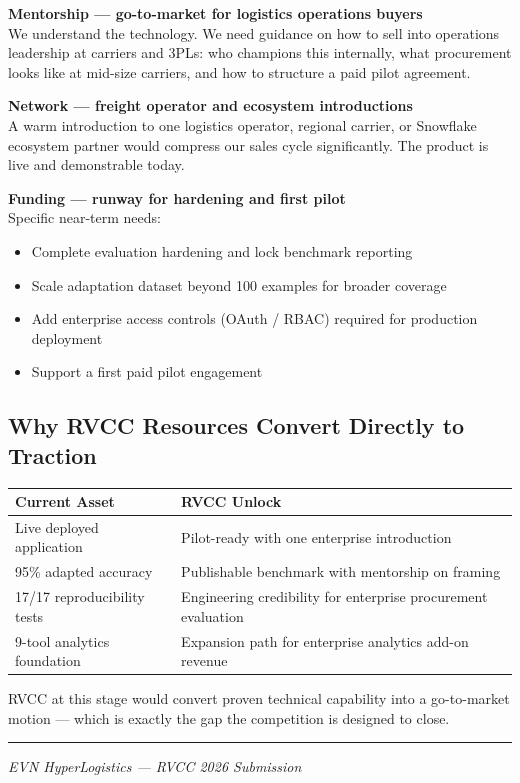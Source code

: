 \documentclass[11pt,letterpaper]{article}
\begin{document}
\textbf{Mentorship --- go-to-market for logistics operations buyers}\\
We understand the technology. We need guidance on how to sell into operations leadership at carriers and 3PLs: who champions this internally, what procurement looks like at mid-size carriers, and how to structure a paid pilot agreement.

\textbf{Network --- freight operator and ecosystem introductions}\\
A warm introduction to one logistics operator, regional carrier, or Snowflake ecosystem partner would compress our sales cycle significantly. The product is live and demonstrable today.

\textbf{Funding --- runway for hardening and first pilot}\\
Specific near-term needs:
\begin{itemize}[leftmargin=1.5em, itemsep=0.2em]
    \item Complete evaluation hardening and lock benchmark reporting
    \item Scale adaptation dataset beyond 100 examples for broader coverage
    \item Add enterprise access controls (OAuth / RBAC) required for production deployment
    \item Support a first paid pilot engagement
\end{itemize}

\subsection*{Why RVCC Resources Convert Directly to Traction}

\vspace{0.3em}
\begin{tabular}{@{}L{5.5cm}L{8cm}@{}}
    \toprule
    \textbf{Current Asset} & \textbf{RVCC Unlock} \\
    \midrule
    Live deployed application & Pilot-ready with one enterprise introduction \\[0.3em]
    95\% adapted accuracy & Publishable benchmark with mentorship on framing \\[0.3em]
    17/17 reproducibility tests & Engineering credibility for enterprise procurement evaluation \\[0.3em]
    9-tool analytics foundation & Expansion path for enterprise analytics add-on revenue \\
    \bottomrule
\end{tabular}
\vspace{0.5em}

RVCC at this stage would convert proven technical capability into a go-to-market motion --- which is exactly the gap the competition is designed to close.

\vspace{2em}
\begin{center}
    \hrule height 0.8pt
    \vspace{0.5em}
    \textit{EVN HyperLogistics --- RVCC 2026 Submission}
\end{center}
\end{document}
